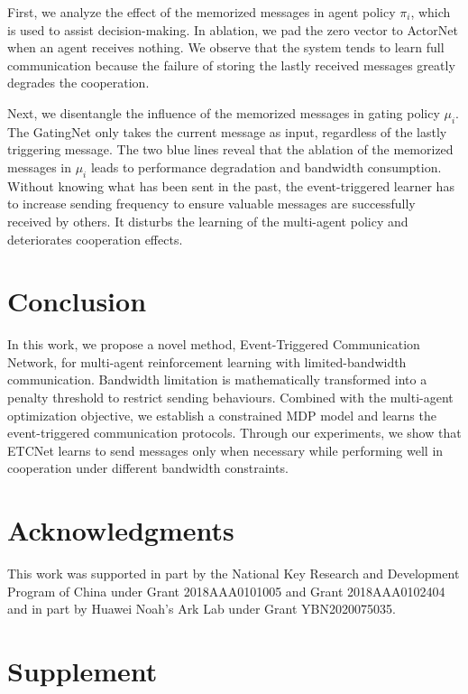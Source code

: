 \documentclass[letterpaper]{article} %
\begin{document}
First, we analyze the effect of the memorized messages in agent policy $\pi_i$, which is used to assist decision-making. In ablation, we pad the zero vector to ActorNet when an agent receives nothing.
We observe that the system tends to learn full communication because the failure of storing the lastly received messages greatly degrades the cooperation.

Next, we disentangle the influence of the memorized messages in gating policy $\mu_i$. The GatingNet only takes the current message as input, regardless of the lastly triggering message.
The two blue lines reveal that the ablation of the memorized messages in $\mu_i$ leads to performance degradation and bandwidth consumption.
Without knowing what has been sent in the past, the event-triggered learner has to increase sending frequency to ensure valuable messages are successfully received by others. It disturbs the learning of the multi-agent policy and deteriorates cooperation effects.


\section {Conclusion}\label{sec:Conclusion}

In this work, we propose a novel method, Event-Triggered Communication Network, for multi-agent reinforcement learning with limited-bandwidth communication.
Bandwidth limitation is mathematically transformed into a penalty threshold to restrict sending behaviours. Combined with the multi-agent optimization objective,
we establish a constrained MDP model and learns the event-triggered communication protocols. Through our experiments, we show that
ETCNet learns to send messages only when necessary while performing well in cooperation under different bandwidth constraints.

\section*{Acknowledgments}

This work was supported in part by the National Key Research and Development Program of China under Grant 2018AAA0101005 and Grant 2018AAA0102404 and in part by Huawei Noah's Ark Lab under Grant YBN2020075035.






\section*{Supplement}
\end{document}
